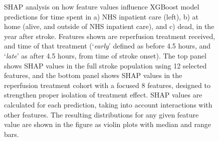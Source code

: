 \begin{figure}[htbp!]
    \vspace{2em}

    \caption{SHAP analysis on how feature values influence XGBoost model predictions for time spent in a) NHS inpatient care (left), b) at home (alive, and outside of NHS inpatient care), and c) dead, in the year after stroke. Features shown are reperfusion treatment received, and time of that treatment (`\textit{early}' defined as before 4.5 hours, and `\textit{late}' as after 4.5 hours, from time of stroke onset). The top panel shows SHAP values in the full stroke population using 12 selected features, and the bottom panel shows SHAP values in the reperfusion treatment cohort with a focused 8 features, designed to strengthen proper isolation of treatment effect. SHAP values are calculated for each prediction, taking into account interactions with other features. The resulting distributions for any given feature value are shown in the figure as violin plots with median and range bars.}
    \label{fig:shap_4}
\end{figure}